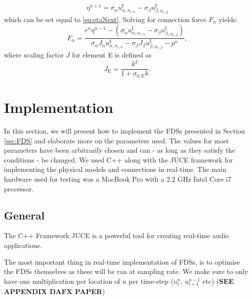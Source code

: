 \documentclass{article}
\begin{document}
\begin{equation}
    \eta^{n+1} = \sigma_\alpha u_{\alpha,x_{\text{c},\alpha}}^\text{I} - \sigma_\beta u_{\beta,x_{\text{c},\beta}}^\text{I}
\end{equation}
which can be set equal to \eqref{eq:etaNext}. Solving for connection force $F_\alpha$ yields:
\begin{equation}
    F_\alpha = \frac{r^n\eta^{n-1}-(\sigma_\alpha u_{\alpha, x_{\text{c},\alpha}}^\text{I} - \sigma_\beta u_{\beta,x_{\text{c},\beta}}^\text{I})}{\sigma_\alpha J_\alpha u_{\alpha, x_{\text{c},\alpha}}^\text{I} - \sigma_\beta J_\beta u_{\beta,x_{\text{c},\beta}}^\text{I}-p^n},
\end{equation}
where scaling factor $J$ for element E is defined as
\begin{equation}
    J_\text{E} = \frac{k^2}{1+\sigma_{0,\text{E}}k}.
\end{equation}
\section{Implementation}\label{sec:implementation}
In this section, we will present how to implement the FDSs presented in Section \ref{sec:FDS} and elaborate more on the parameters used. The values for most parameters have been arbitrarily chosen and can - as long as they satisfy the conditions - be changed. We used C++ along with the JUCE framework for implementing the physical models and connections in real-time. The main hardware used for testing was a MacBook Pro with a 2.2 GHz Intel Core i7 processor.

\subsection{General}
The C++ Framework JUCE is a powerful tool for creating real-time audio applications. 


The most important thing in real-time implementation of FDSs, is to optimise the FDSs themselves as these will be ran at sampling rate. We make sure to only have one multiplication per location of $u$ per time-step ($u_l^n$, $u_{l+1}^{n-1}$ etc) (\textbf{SEE APPENDIX DAFX PAPER}) %
\end{document}
